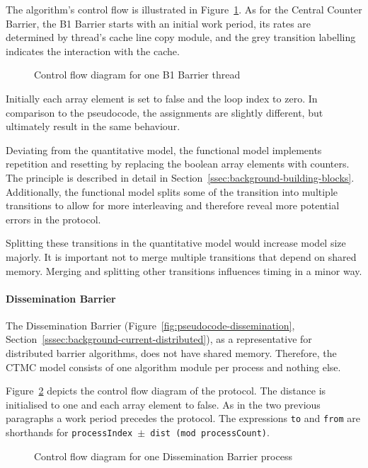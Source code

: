 \documentclass[a4paper, 10pt]{article}
\begin{document}
The algorithm's control flow is illustrated in Figure~\ref{fig:model-b1}. As for the Central Counter Barrier, the B1 Barrier starts with an initial work period, its rates are determined by thread's cache line copy module, and the grey transition labelling indicates the interaction with the cache.

\begin{figure}[htbp]
	\centering
	
	\caption{Control flow diagram for one B1 Barrier thread}
	\label{fig:model-b1}
\end{figure}

Initially each array element is set to false and the loop index to zero.
In comparison to the pseudocode, the assignments are slightly different, but ultimately result in the same behaviour.

Deviating from the quantitative model, the functional model implements repetition and resetting by replacing the boolean array elements with counters. The principle is described in detail in Section~\ref{ssec:background-building-blocks}.
Additionally, the functional model splits some of the transition into multiple transitions to allow for more interleaving and therefore reveal more potential errors in the protocol.

Splitting these transitions in the quantitative model would increase model size majorly. It is important not to merge multiple transitions that depend on shared memory. Merging and splitting other transitions influences timing in a minor way.

\paragraph{Dissemination Barrier}
\label{ssssec:analysis-modelchecking-modelling-dissemination}
The Dissemination Barrier (Figure~\ref{fig:pseudocode-dissemination}, Section~\ref{sssec:background-current-distributed}), as a representative for distributed barrier algorithms, does not have shared memory. Therefore, the CTMC model consists of one algorithm module per process and nothing else.

Figure~\ref{fig:model-dissemination} depicts the control flow diagram of the protocol.
The distance is initialised to one and each array element to false.
As in the two previous paragraphs a work period precedes the protocol.
The expressions \texttt{to} and \texttt{from} are shorthands for \texttt{processIndex $\pm$ dist (mod processCount)}.

\begin{figure}[htbp]
	\centering
	
	\caption{Control flow diagram for one Dissemination Barrier process}
	\label{fig:model-dissemination}
\end{figure}
\end{document}
